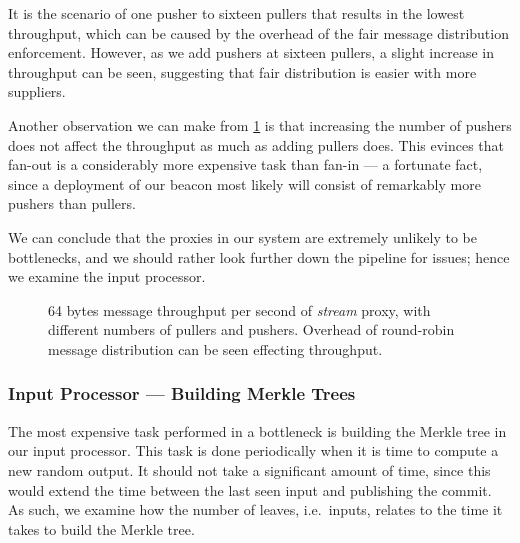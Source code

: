 It is the scenario of one pusher to sixteen pullers that results in the lowest throughput, which can be caused by the overhead of the fair message distribution enforcement.
However, as we add pushers at sixteen pullers, a slight increase in throughput can be seen, suggesting that fair distribution is easier with more suppliers.

Another observation we can make from \cref{fig:proxy_throughput} is that increasing the number of pushers does not affect the throughput as much as adding pullers does.
This evinces that fan-out is a considerably more expensive task than fan-in --- a fortunate fact, since a deployment of our beacon most likely will consist of remarkably more pushers than pullers.

We can conclude that the proxies in our system are extremely unlikely to be bottlenecks, and we should rather look further down the pipeline for issues; hence we examine the input processor.

\begin{figure}
    \centering
    \footnotesize
    \caption{%
        64 bytes message throughput per second of \textit{stream} proxy, with different numbers of pullers and pushers.
Overhead of round-robin message distribution can be seen effecting throughput.}%
\label{fig:proxy_throughput}
\end{figure}

\subsubsection{Input Processor --- Building Merkle Trees}%
\label{ssub:input_processor_building_merkle_trees}
The most expensive task performed in a bottleneck is building the Merkle tree in our input processor.
This task is done periodically when it is time to compute a new random output.
It should not take a significant amount of time, since this would extend the time between the last seen input and publishing the commit.
As such, we examine how the number of leaves, i.e.\ inputs, relates to the time it takes to build the Merkle tree.

